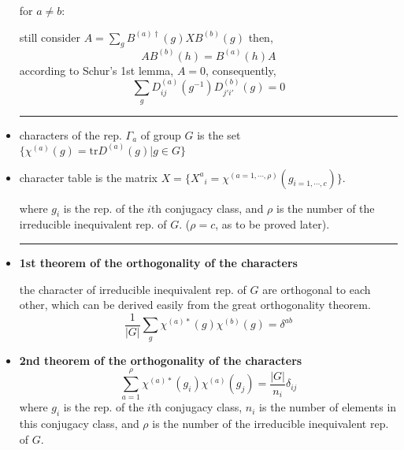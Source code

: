 \begin{itemize}
\begin{tcolorbox}[title=proof:]
		for $a \neq b$:
		
		still consider $A = \sum_g B^{(a) \dagger}(g) X B^{(b)}(g)$ then,
		\begin{equation}
			A B^{(b)}(h) = B^{(a)}(h) A
		\end{equation}
		according to Schur’s 1st lemma, $A = 0$, consequently,
		\begin{equation}
			\sum_g D^{(a)}_{i j}(g^{-1}) D^{(b)}_{j' i'}(g) = 0
		\end{equation}
	\end{tcolorbox}
	
	\noindent\rule[0.5ex]{\linewidth}{0.5pt} %
	
	\item characters of the rep. $\Gamma_a$ of group $G$ is the set $\{\chi^{(a)}(g) = \mathrm{tr} D^{(a)}(g) | g \in G\}$
	
	\item character table is the matrix $X = \{{X^a}_i = \chi^{(a = 1, \cdots, \rho)}(g_{i = 1, \cdots, c})\}$.
	
	where $g_i$ is the rep. of the $i$th conjugacy class, and $\rho$ is the number of the irreducible inequivalent rep. of $G$. ($\rho = c$, as to be proved later).
	
	\noindent\rule[0.5ex]{\linewidth}{0.5pt} %
	
	\item \textbf{1st theorem of the orthogonality of the characters}
	
	the character of irreducible inequivalent rep. of $G$ are orthogonal to each other, which can be derived easily from the great orthogonality theorem.
	\begin{equation}
		\frac{1}{|G|} \sum_g \chi^{(a) *}(g) \chi^{(b)}(g) = \delta^{a b}
	\end{equation}
	
	
	
	\item \textbf{2nd theorem of the orthogonality of the characters}
	\begin{equation}
		\sum_{a = 1}^\rho \chi^{(a) *}(g_i) \chi^{(a)}(g_j) = \frac{|G|}{n_i} \delta_{i j}
	\end{equation}
	where $g_i$ is the rep. of the $i$th conjugacy class, $n_i$ is the number of elements in this conjugacy class, and $\rho$ is the number of the irreducible inequivalent rep. of $G$.
	

\end{itemize}
